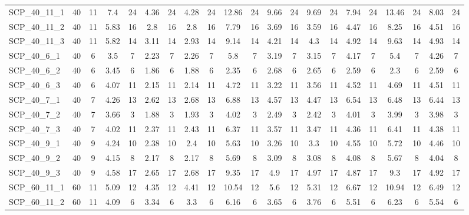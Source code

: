 \begin{sidewaystable}[!ht]
{\begin{tabular}{lcccccccccccccccccccc}
SCP\_40\_11\_1 & 40 & 11 & 7.4 & 24 & 4.36 & 24 &  \textcolor{blue2}{4.28} & 24 & 12.86 & 24 & 9.66 & 24 & 9.69 & 24 & 7.94 & 24 & 13.46 & 24 & 8.03 & 24 \\
SCP\_40\_11\_2 & 40 & 11 & 5.83 & 16 &  \textcolor{blue2}{2.8} & 16 &  \textcolor{blue2}{2.8} & 16 & 7.79 & 16 & 3.69 & 16 & 3.59 & 16 & 4.47 & 16 & 8.25 & 16 & 4.51 & 16 \\
SCP\_40\_11\_3 & 40 & 11 & 5.82 & 14 & 3.11 & 14 &  \textcolor{blue2}{2.93} & 14 & 9.14 & 14 & 4.21 & 14 & 4.3 & 14 & 4.92 & 14 & 9.63 & 14 & 4.93 & 14 \\
SCP\_40\_6\_1 & 40 & 6 & 3.5 & 7 &  \textcolor{blue2}{2.23} & 7 & 2.26 & 7 & 5.8 & 7 & 3.19 & 7 & 3.15 & 7 & 4.17 & 7 & 5.4 & 7 & 4.26 & 7 \\
SCP\_40\_6\_2 & 40 & 6 & 3.45 & 6 &  \textcolor{blue2}{1.86} & 6 & 1.88 & 6 & 2.35 & 6 & 2.68 & 6 & 2.65 & 6 & 2.59 & 6 & 2.3 & 6 & 2.59 & 6 \\
SCP\_40\_6\_3 & 40 & 6 & 4.07 & 11 & 2.15 & 11 &  \textcolor{blue2}{2.14} & 11 & 4.72 & 11 & 3.22 & 11 & 3.56 & 11 & 4.52 & 11 & 4.69 & 11 & 4.51 & 11 \\
SCP\_40\_7\_1 & 40 & 7 & 4.26 & 13 &  \textcolor{blue2}{2.62} & 13 & 2.68 & 13 & 6.88 & 13 & 4.57 & 13 & 4.47 & 13 & 6.54 & 13 & 6.48 & 13 & 6.44 & 13 \\
SCP\_40\_7\_2 & 40 & 7 & 3.66 & 3 &  \textcolor{blue2}{1.88} & 3 & 1.93 & 3 & 4.02 & 3 & 2.49 & 3 & 2.42 & 3 & 4.01 & 3 & 3.99 & 3 & 3.98 & 3 \\
SCP\_40\_7\_3 & 40 & 7 & 4.02 & 11 &  \textcolor{blue2}{2.37} & 11 & 2.43 & 11 & 6.37 & 11 & 3.57 & 11 & 3.47 & 11 & 4.36 & 11 & 6.41 & 11 & 4.38 & 11 \\
SCP\_40\_9\_1 & 40 & 9 & 4.24 & 10 &  \textcolor{blue2}{2.38} & 10 & 2.4 & 10 & 5.63 & 10 & 3.26 & 10 & 3.3 & 10 & 4.55 & 10 & 5.72 & 10 & 4.46 & 10 \\
SCP\_40\_9\_2 & 40 & 9 & 4.15 & 8 &  \textcolor{blue2}{2.17} & 8 &  \textcolor{blue2}{2.17} & 8 & 5.69 & 8 & 3.09 & 8 & 3.08 & 8 & 4.08 & 8 & 5.67 & 8 & 4.04 & 8 \\
SCP\_40\_9\_3 & 40 & 9 & 4.58 & 17 &  \textcolor{blue2}{2.65} & 17 & 2.68 & 17 & 9.35 & 17 & 4.9 & 17 & 4.97 & 17 & 4.87 & 17 & 9.3 & 17 & 4.92 & 17 \\
SCP\_60\_11\_1 & 60 & 11 & 5.09 & 12 &  \textcolor{blue2}{4.35} & 12 & 4.41 & 12 & 10.54 & 12 & 5.6 & 12 & 5.31 & 12 & 6.67 & 12 & 10.94 & 12 & 6.49 & 12 \\
SCP\_60\_11\_2 & 60 & 11 & 4.09 & 6 & 3.34 & 6 &  \textcolor{blue2}{3.3} & 6 & 6.16 & 6 & 3.65 & 6 & 3.76 & 6 & 5.51 & 6 & 6.23 & 6 & 5.54 & 6 \\

\end{tabular}}
\end{sidewaystable}
